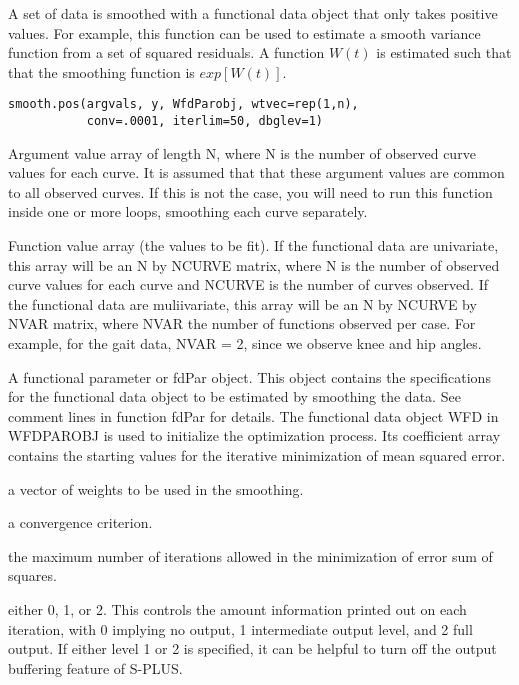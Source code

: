 \documentclass{article}
\begin{document}
\begin{Description}\relax
A set of data is smoothed with a functional data object that only
takes positive values.  For example, this function can be used to
estimate a smooth variance function from a set of squared residuals.
A function $W(t)$ is estimated such that that the smoothing function
is $exp[W(t)]$.
\end{Description}
\begin{Usage}
\begin{verbatim}
smooth.pos(argvals, y, WfdParobj, wtvec=rep(1,n),
           conv=.0001, iterlim=50, dbglev=1)
\end{verbatim}
\end{Usage}
\begin{Arguments}
\begin{ldescription}
\item[\code{argvals}] Argument value array of length N, where N is the number of observed
curve values for each curve.  It is assumed that that these argument
values are common to all observed curves.  If this is not the case,
you will need to run this function inside one or more loops,
smoothing each curve separately.

\item[\code{y}] Function value array (the values to be fit).  If the functional data
are univariate, this array will be an N by NCURVE matrix, where N is
the number of observed curve values for each curve and NCURVE is the
number of curves observed.  If the functional data are muliivariate,
this array will be an N by NCURVE by NVAR matrix, where NVAR the
number of functions observed per case.  For example, for the gait
data, NVAR = 2, since we observe knee and hip angles.

\item[\code{WfdParobj}] A functional parameter or fdPar object.  This object contains the
specifications for the functional data object to be estimated by
smoothing the data.  See comment lines in function fdPar for
details.  The functional data object WFD in WFDPAROBJ is used to
initialize the optimization process.  Its coefficient array contains
the starting values for the iterative minimization of mean squared
error.

\item[\code{wtvec}] a vector of weights to be used in the smoothing.

\item[\code{conv}] a convergence criterion.

\item[\code{iterlim}] the maximum number of iterations allowed in the minimization of
error sum of squares.

\item[\code{dbglev}] either 0, 1, or 2.  This controls the amount information printed out
on each iteration, with 0 implying no output, 1 intermediate output
level, and 2 full output.  If either level 1 or 2 is specified, it
can be helpful to turn off the output buffering feature of S-PLUS.

\end{ldescription}
\end{Arguments}
\end{document}
